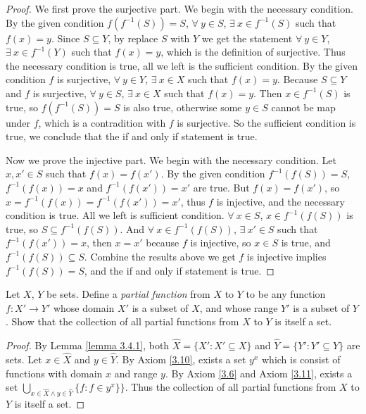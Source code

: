\begin{proof}
We first prove the surjective part.
We begin with the necessary condition.
By the given condition \(f(f^{-1}(S)) = S\), \(\forall\ y \in S\), \(\exists\ x \in f^{-1}(S)\) such that \(f(x) = y\).
Since \(S \subseteq Y\), by replace \(S\) with \(Y\) we get the statement \(\forall\ y \in Y\), \(\exists\ x \in f^{-1}(Y)\) such that \(f(x) = y\), which is the definition of surjective.
Thus the necessary condition is true, all we left is the sufficient condition.
By the given condition \(f\) is surjective, \(\forall\ y \in Y\), \(\exists\ x \in X\) such that \(f(x) = y\).
Because \(S \subseteq Y\) and \(f\) is surjective, \(\forall\ y \in S\), \(\exists\ x \in X\) such that \(f(x) = y\).
Then \(x \in f^{-1}(S)\) is true, so \(f(f^{-1}(S)) = S\) is also true, otherwise some \(y \in S\) cannot be map under \(f\), which is a contradition with \(f\) is surjective.
So the sufficient condition is true, we conclude that the if and only if statement is true.

Now we prove the injective part.
We begin with the necessary condition.
Let \(x, x' \in S\) such that \(f(x) = f(x')\).
By the given condition \(f^{-1}(f(S)) = S\), \(f^{-1}(f(x)) = x\) and \(f^{-1}(f(x')) = x'\) are true.
But \(f(x) = f(x')\), so \(x = f^{-1}(f(x)) = f^{-1}(f(x')) = x'\), thus \(f\) is injective, and the necessary condition is true.
All we left is sufficient condition.
\(\forall\ x \in S\), \(x \in f^{-1}(f(S))\) is true, so \(S \subseteq f^{-1}(f(S))\).
And \(\forall\ x \in f^{-1}(f(S))\), \(\exists\ x' \in S\) such that \(f^{-1}(f(x')) = x\), then \(x = x'\) because \(f\) is injective, so \(x \in S\) is true, and \(f^{-1}(f(S)) \subseteq S\).
Combine the results above we get \(f\) is injective implies \(f^{-1}(f(S)) = S\), and the if and only if statement is true.
\end{proof}

\begin{exercise}\label{exercise 3.4.6}
Let \(X\), \(Y\) be sets.
Define a \emph{partial function} from \(X\) to \(Y\) to be any function \(f : X' \to Y'\) whose domain \(X'\) is a subset of \(X\), and whose range \(Y'\) is a subset of \(Y\).
Show that the collection of all partial functions from \(X\) to \(Y\) is itself a set.
\end{exercise}

\begin{proof}
By Lemma \ref{lemma 3.4.1}, both \(\hat{X} = \{X' : X' \subseteq X\}\) and \(\hat{Y} = \{Y' : Y' \subseteq Y\}\) are sets.
Let \(x \in \hat{X}\) and \(y \in \hat{Y}\).
By Axiom \ref{3.10}, exists a set \(y^{x}\) which is consist of functions with domain \(x\) and range \(y\).
By Axiom \ref{3.6} and Axiom \ref{3.11}, exists a set \(\bigcup_{x \in \hat{X} \land y \in \hat{Y}} \{f : f \in y^{x}\}\}\).
Thus the collection of all partial functions from \(X\) to \(Y\) is itself a set.
\end{proof}

